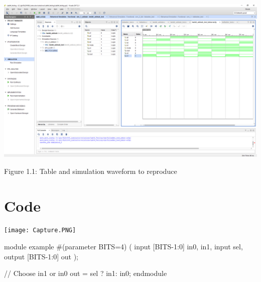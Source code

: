 \documentclass[11pt]{article}
\begin{document}
\begin{center}
	\includegraphics[width=1.0\textwidth, trim=19cm 15cm .5cm 4cm,clip]{lab1_example_screenshot.PNG}
\end{center}	
\begin{center}
Figure 1.1: Table and simulation waveform to reproduce 
\end{center}
	
	
\section*{Code}
\begin{center}
	\texttt{[image: Capture.PNG]}
\end{center}

module example
\#(parameter BITS=4)
(
input [BITS-1:0] in0, in1,
input sel,
output [BITS-1:0] out
);

// Choose in1 or in0
out = sel ? in1: in0; 
endmodule
\end{document}
